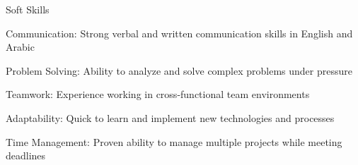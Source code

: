 \begin{resume_section}{Soft Skills}
    \begin{subitems}
        \item Communication: Strong verbal and written communication skills in English and Arabic
        \item Problem Solving: Ability to analyze and solve complex problems under pressure
        \item Teamwork: Experience working in cross-functional team environments
        \item Adaptability: Quick to learn and implement new technologies and processes
        \item Time Management: Proven ability to manage multiple projects while meeting deadlines
    \end{subitems}
\end{resume_section}

